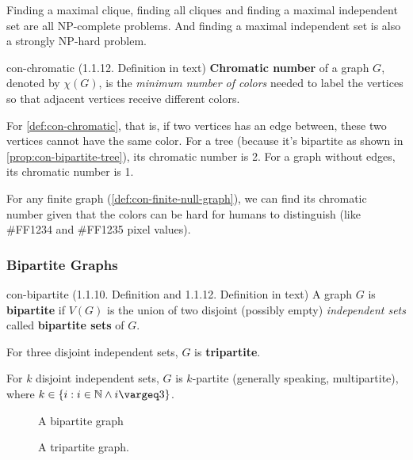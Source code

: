 \documentclass[../src/handouts/main.tex]{subfiles}
\begin{document}
Finding a maximal clique, finding all cliques and finding a maximal independent set are all NP-complete problems.
And finding a maximal independent set is also a strongly NP-hard problem.

\begin{definition}{}{con-chromatic}
  (1.1.12. Definition in text)
  \textbf{Chromatic number} of a graph $G$, denoted by $\chi (G)$, is the \textit{minimum number of colors} needed to label the vertices so that adjacent vertices receive different colors.
\end{definition}

For \cref{def:con-chromatic}, that is, if two vertices has an edge between, these two vertices cannot have the same color. For a tree (because it's bipartite as shown in \cref{prop:con-bipartite-tree}), its chromatic number is 2. For a graph without edges, its chromatic number is 1.

For any finite graph (\cref{def:con-finite-null-graph}), we can find its chromatic number given that the colors can be hard for humans to distinguish (like \#FF1234 and \#FF1235 pixel values).


\subsubsection{Bipartite Graphs}

\begin{definition}{}{con-bipartite}
  (1.1.10. Definition and 1.1.12. Definition in text)
  A graph $G$ is \textbf{bipartite} if $V(G)$ is the union of two disjoint (possibly empty) \textit{independent sets} called \textbf{bipartite sets} of $G$.

  For three disjoint independent sets, $G$ is \textbf{tripartite}.

  For $k$ disjoint independent sets, $G$ is $k$-partite (generally speaking, multipartite), where $k \in \set{ i : i \in \N \land i \geq 3}$.
\end{definition}

\begin{figure*}[ht]
  \centering
  \begin{subfigure}{.4\textwidth}
    \centering
    \bipartitegraphwithlabels
    \caption{A bipartite graph}
    \label{fig:con-bipartite}
  \end{subfigure}
  \hspace{.1\textwidth}
  \begin{subfigure}{.4\textwidth}
    \centering
    \tripartitegraph
    \caption{A tripartite graph.}
    \label{fig:con-tripartite}
  \end{subfigure}
  \caption{Bipartite and tripartite graphs.}
  \label{fig:con-bipartite-tripartite}
\end{figure*}
\end{document}
